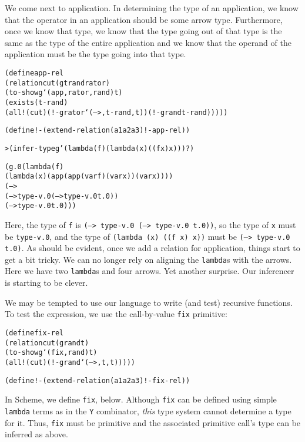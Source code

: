 We come next to application.  In determining the type of an
application, we know that the operator in an application should be
some arrow type.  Furthermore, once we know that type, we know that
the type going out of that type is the same as the type of the entire
application and we know that the operand of the application must be
the type going into that type.  

\begin{alltt}
(define app-rel
  (relation cut (g t rand rator)
    (to-show g `(app ,rator ,rand) t)
    (exists (t-rand)
      (all! (cut) (!- g rator `(--> ,t-rand ,t)) (!- g rand t-rand)))))

(define !- (extend-relation (a1 a2 a3) !- app-rel))
\end{alltt}

\begin{alltt}
> (infer-type g '(lambda (f) (lambda (x) ((f x) x))) ?)

(g.0 (lambda (f)
       (lambda (x) (app (app (var f) (var x)) (var x))))
     (--> 
       (--> type-v.0 (--> type-v.0 t.0))
       (--> type-v.0 t.0)))
\end{alltt}

Here, the type of \texttt{f} is \texttt{(--> type-v.0 (--> type-v.0 t.0))}, so
the type of \texttt{x} must be \texttt{type-v.0}, and the type of
\texttt{(lambda (x) ((f x) x))} must be \texttt{(--> type-v.0 t.0)}.
As should be evident, once we add a relation for application, things
start to get a bit tricky.  We can no longer rely on aligning the
\texttt{lambda}s with the arrows.  Here we have two \texttt{lambda}s
and four arrows.  Yet another surprise.  Our inferencer is starting
to be clever.

We may be tempted to use our language to write (and test) recursive
functions.  To test the expression, we use the call-by-value \texttt{fix}
primitive:

\begin{alltt}
(define fix-rel
  (relation cut (g rand t)
    (to-show g `(fix ,rand) t)
    (all! (cut) (!- g rand `(--> ,t ,t)))))

(define !- (extend-relation (a1 a2 a3) !- fix-rel))
\end{alltt}

In Scheme, we define \texttt{fix}, below.  Although \texttt{fix} can
be defined using simple \texttt{lambda} terms as in the \texttt{Y}
combinator, \emph{this} type system cannot determine a type for it.
Thus, \texttt{fix} must be primitive and the associated primitive
call's type can be inferred as above.

